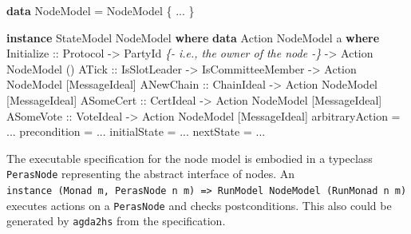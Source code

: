\documentclass[10pt]{article}
\newenvironment{Shaded}{}{}
\newcommand{\CommentTok}[1]{\textcolor[rgb]{0.38,0.63,0.69}{\textit{#1}}}
\newcommand{\DataTypeTok}[1]{\textcolor[rgb]{0.56,0.13,0.00}{#1}}
\newcommand{\KeywordTok}[1]{\textcolor[rgb]{0.00,0.44,0.13}{\textbf{#1}}}
\newcommand{\NormalTok}[1]{#1}
\newcommand{\OperatorTok}[1]{\textcolor[rgb]{0.40,0.40,0.40}{#1}}
\newcommand{\OtherTok}[1]{\textcolor[rgb]{0.00,0.44,0.13}{#1}}
\begin{document}
\begin{Shaded}
\begin{Highlighting}[]
\KeywordTok{data} \DataTypeTok{NodeModel} \OtherTok{=} \DataTypeTok{NodeModel}\NormalTok{ \{ }\OperatorTok{...}\NormalTok{ \}}
\end{Highlighting}
\end{Shaded}

\begin{Shaded}
\begin{Highlighting}[]
\KeywordTok{instance} \DataTypeTok{StateModel} \DataTypeTok{NodeModel} \KeywordTok{where}
  \KeywordTok{data} \DataTypeTok{Action} \DataTypeTok{NodeModel}\NormalTok{ a }\KeywordTok{where}
    \DataTypeTok{Initialize}\OtherTok{ ::} \DataTypeTok{Protocol} \OtherTok{{-}\textgreater{}} \DataTypeTok{PartyId} \CommentTok{\{{-} i.e., the owner of the node {-}\}} \OtherTok{{-}\textgreater{}} \DataTypeTok{Action} \DataTypeTok{NodeModel}\NormalTok{ ()}
    \DataTypeTok{ATick}\OtherTok{ ::} \DataTypeTok{IsSlotLeader} \OtherTok{{-}\textgreater{}} \DataTypeTok{IsCommitteeMember} \OtherTok{{-}\textgreater{}} \DataTypeTok{Action} \DataTypeTok{NodeModel}\NormalTok{ [}\DataTypeTok{MessageIdeal}\NormalTok{]}
    \DataTypeTok{ANewChain}\OtherTok{ ::} \DataTypeTok{ChainIdeal} \OtherTok{{-}\textgreater{}} \DataTypeTok{Action} \DataTypeTok{NodeModel}\NormalTok{ [}\DataTypeTok{MessageIdeal}\NormalTok{]}
    \DataTypeTok{ASomeCert}\OtherTok{ ::} \DataTypeTok{CertIdeal} \OtherTok{{-}\textgreater{}} \DataTypeTok{Action} \DataTypeTok{NodeModel}\NormalTok{ [}\DataTypeTok{MessageIdeal}\NormalTok{]}
    \DataTypeTok{ASomeVote}\OtherTok{ ::} \DataTypeTok{VoteIdeal} \OtherTok{{-}\textgreater{}} \DataTypeTok{Action} \DataTypeTok{NodeModel}\NormalTok{ [}\DataTypeTok{MessageIdeal}\NormalTok{]}
\NormalTok{  arbitraryAction }\OtherTok{=} \OperatorTok{...}
\NormalTok{  precondition }\OtherTok{=} \OperatorTok{...}
\NormalTok{  initialState }\OtherTok{=} \OperatorTok{...}
\NormalTok{  nextState }\OtherTok{=} \OperatorTok{...}
\end{Highlighting}
\end{Shaded}

The executable specification for the node model is embodied in a
typeclass \texttt{PerasNode} representing the abstract interface of
nodes. An
\texttt{instance\ (Monad\ m,\ PerasNode\ n\ m)\ =\textgreater{}\ RunModel\ NodeModel\ (RunMonad\ n\ m)}
executes actions on a \texttt{PerasNode} and checks postconditions. This
also could be generated by \texttt{agda2hs} from the specification.
\end{document}
